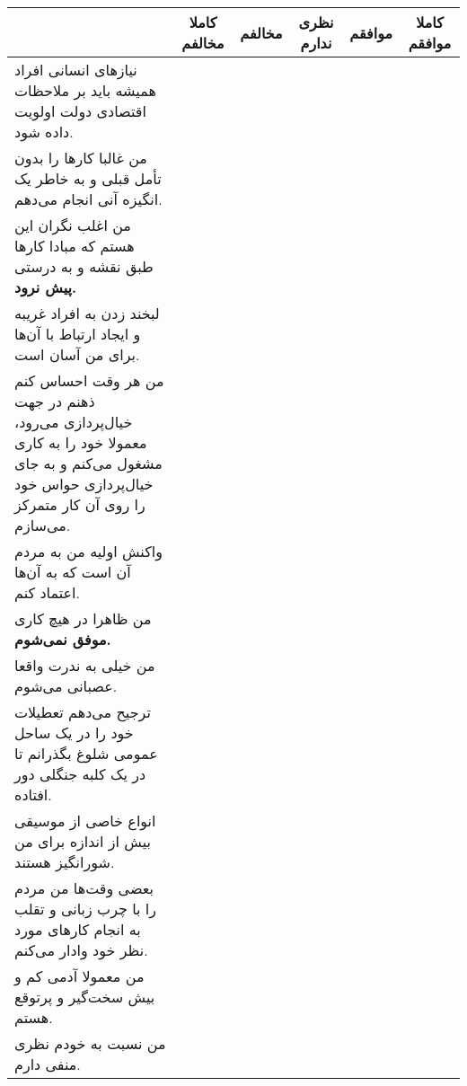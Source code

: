 \documentclass[a4paper,10pt]{article}
\begin{document}
\begin{center}
\begin{tabular}{|p{6cm}|c|c|c|c|c|}
\hline
 & کاملا مخالفم & مخالفم & نظری ندارم & موافقم & کاملا موافقم\\
\hline




نیازهای انسانی افراد همیشه باید بر ملاحظات اقتصادی دولت اولویت داده شود.& & & & & \\
\hline





من غالبا کارها را بدون تأمل قبلی و به خاطر یک انگیزه آنی انجام می‌دهم.& & & & & \\
\hline


من اغلب نگران این هستم که مبادا کارها طبق نقشه و به درستی \textbf{پیش نرود.}& & & & & \\
\hline


لبخند زدن به افراد غریبه و ایجاد ارتباط با آن‌ها برای من آسان است.& & & & & \\
\hline


من هر وقت احساس کنم ذهنم در جهت خیال‌پردازی می‌رود، معمولا خود را به کاری مشغول می‌کنم و به جای خیال‌پردازی حواس خود را روی آن کار متمرکز می‌سازم.& & & & & \\
\hline


واکنش اولیه من به مردم آن است که به آن‌ها اعتماد کنم.& & & & & \\
\hline


من ظاهرا در هیچ‌ کاری \textbf{موفق نمی‌شوم.}& & & & & \\
\hline


من خیلی به ندرت واقعا عصبانی می‌شوم.& & & & & \\
\hline


ترجیح می‌دهم تعطیلات خود را در یک ساحل عمومی شلوغ بگذرانم تا در یک کلبه جنگلی دور افتاده.& & & & & \\
\hline


انواع خاصی از موسیقی بیش از اندازه برای من شورانگیز هستند.& & & & & \\
\hline


بعضی وقت‌ها من مردم را با چرب زبانی و تقلب به انجام کارهای مورد نظر خود وادار می‌کنم.& & & & & \\
\hline


من معمولا آدمی کم و بیش سخت‌گیر و پرتوقع هستم.& & & & & \\
\hline


من نسبت به خودم نظری منفی دارم.& & & & & \\
\hline



\end{tabular}
\end{center}
\end{document}
